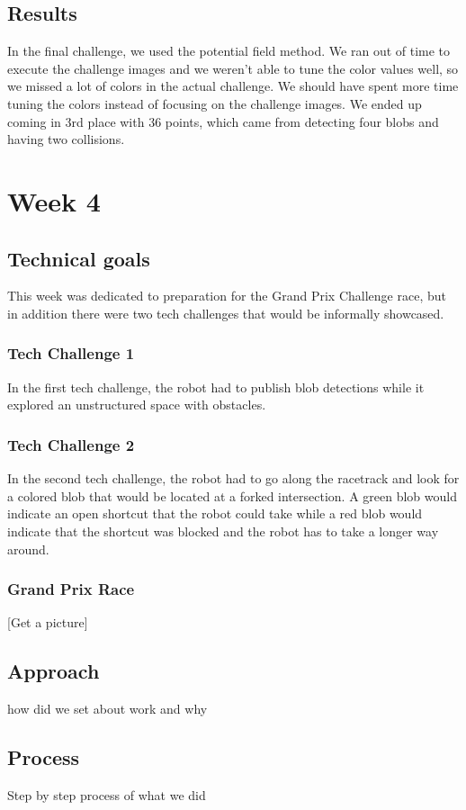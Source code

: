 \documentclass[journal, a4paper]{IEEEtran}
\begin{document}
\subsection{Results}
In the final challenge, we used the potential field method. We ran out of time to execute the challenge images and we weren’t able to tune the color values well, so we missed a lot of colors in the actual challenge. We should have spent more time tuning the colors instead of focusing on the challenge images. We ended up coming in 3rd place with 36 points, which came from detecting four blobs and having two collisions. 

\section{Week 4}
\subsection{Technical goals}
This week was dedicated to preparation for the Grand Prix Challenge race, but in addition there were two tech challenges that would be informally showcased. 
\subsubsection{Tech Challenge 1}
In the first tech challenge, the robot had to publish blob detections while it explored an unstructured space with obstacles.  
\subsubsection{Tech Challenge 2}
In the second tech challenge, the robot had to go along the racetrack and look for a colored blob that would be located at a forked intersection. A green blob would indicate an open shortcut that the robot could take while a red blob would indicate that the shortcut was blocked and the robot has to take a longer way around. 
\subsubsection{Grand Prix Race}
[Get a picture]
\subsection{Approach}
how did we set about work and why
\subsection{Process}
Step by step process of what we did
\end{document}
